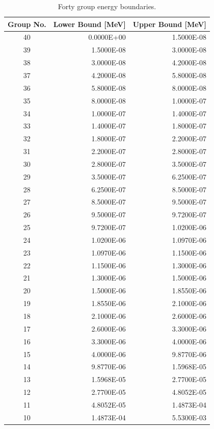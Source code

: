 \begin{appendices}
\begin{table}[h!]
  \centering	
  \footnotesize
  \caption{Forty group energy boundaries.}
  \label{table:app-40-groups} 
  \vspace{14pt}
  \begin{tabular}{c r r}
    \toprule
    {\bf Group No.} &
    {\bf Lower Bound [MeV]} &
    {\bf Upper Bound [MeV]} \\
    \midrule
40 & 0.0000E+00 & 1.5000E-08 \\
39 & 1.5000E-08 & 3.0000E-08 \\
38 & 3.0000E-08 & 4.2000E-08 \\
37 & 4.2000E-08 & 5.8000E-08 \\
36 & 5.8000E-08 & 8.0000E-08 \\
35 & 8.0000E-08 & 1.0000E-07 \\
34 & 1.0000E-07 & 1.4000E-07 \\
33 & 1.4000E-07 & 1.8000E-07 \\
32 & 1.8000E-07 & 2.2000E-07 \\
31 & 2.2000E-07 & 2.8000E-07 \\
30 & 2.8000E-07 & 3.5000E-07 \\
29 & 3.5000E-07 & 6.2500E-07 \\
28 & 6.2500E-07 & 8.5000E-07 \\
27 & 8.5000E-07 & 9.5000E-07 \\
26 & 9.5000E-07 & 9.7200E-07 \\
25 & 9.7200E-07 & 1.0200E-06 \\
24 & 1.0200E-06 & 1.0970E-06 \\
23 & 1.0970E-06 & 1.1500E-06 \\
22 & 1.1500E-06 & 1.3000E-06 \\
21 & 1.3000E-06 & 1.5000E-06 \\
20 & 1.5000E-06 & 1.8550E-06 \\
19 & 1.8550E-06 & 2.1000E-06 \\
18 & 2.1000E-06 & 2.6000E-06 \\
17 & 2.6000E-06 & 3.3000E-06 \\
16 & 3.3000E-06 & 4.0000E-06 \\
15 & 4.0000E-06 & 9.8770E-06 \\
14 & 9.8770E-06 & 1.5968E-05 \\
13 & 1.5968E-05 & 2.7700E-05 \\
12 & 2.7700E-05 & 4.8052E-05 \\
11 & 4.8052E-05 & 1.4873E-04 \\
10 & 1.4873E-04 & 5.5300E-03 \\

\end{tabular}
\end{table}
\end{appendices}
